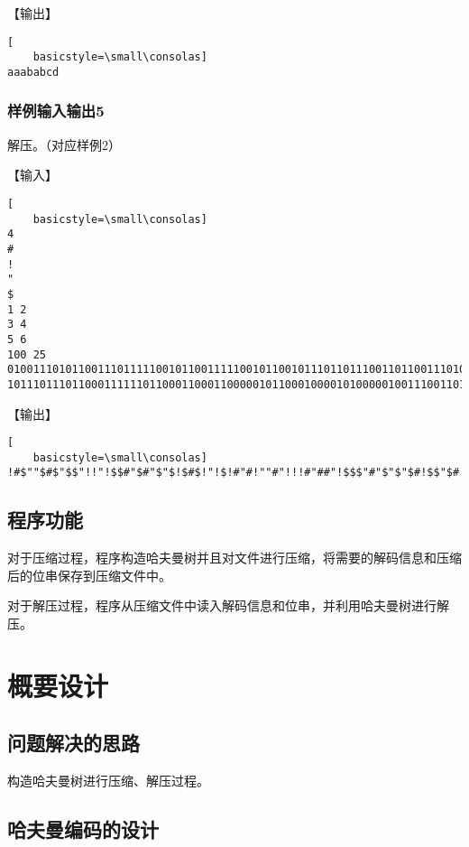 \documentclass{article}
\begin{document}
【输出】

\begin{lstlisting}[
    basicstyle=\small\consolas]
aaababcd
\end{lstlisting}

\subsubsection{样例输入输出5}

解压。（对应样例2）

【输入】

\begin{lstlisting}[
    basicstyle=\small\consolas]
4
#
!
"
$
1 2
3 4
5 6
100 25
010011101011001110111110010110011111001011001011101101110011011001110100100001101000100101010010000010011111111000
10111011101100011111101100011000110000010110001000010100000100111001101011011001001111
\end{lstlisting}

【输出】

\begin{lstlisting}[
    basicstyle=\small\consolas]
!#$""$#$"$$"!!"!$$#"$#"$"$!$#$!"!$!#"#!""#"!!!#"##"!$$$"#"$"$"$#!$$"$#!"#$##!!"#"#!!##!#$"!""$!"!#$$
\end{lstlisting}

\subsection{程序功能}

对于压缩过程，程序构造哈夫曼树并且对文件进行压缩，将需要的解码信息和压缩后的位串保存到压缩文件中。

对于解压过程，程序从压缩文件中读入解码信息和位串，并利用哈夫曼树进行解压。

\section{概要设计}

\subsection{问题解决的思路}

构造哈夫曼树进行压缩、解压过程。

\subsection{哈夫曼编码的设计}
\end{document}
